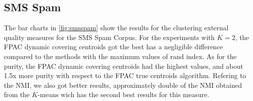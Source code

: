 \documentclass[runningheads]{llncs}
\begin{document}
\subsection{SMS Spam}

The bar charts in \ref{fig:smsspam} show the results for the
clustering external quality measures for the SMS Spam Corpus.
For the experiments with $K=2$, the FPAC dynamic covering centroids
got the best 
has a negligible difference compared to the methods with the maximum values of rand index. As for the purity, the FPAC dynamic covering
centroids had the highest values, and about 1.5x more purity with respect to the FPAC true centroids algorithm. Refering to the
NMI, we also got better results, approximately double of the 
NMI obtained from the $K$-means wich has the second best results
for this measure.
\end{document}
